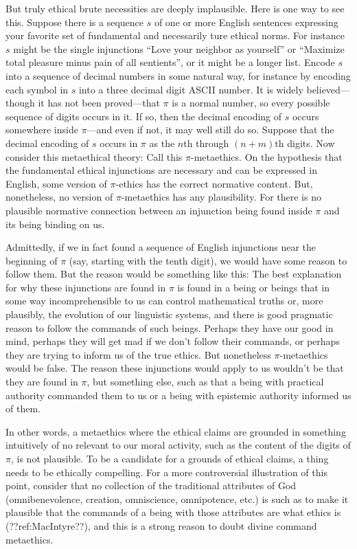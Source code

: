 But truly ethical brute necessities are deeply implausible. Here is one way to see this. Suppose there is a sequence $s$ of one or more English sentences expressing your 
favorite set of fundamental and necessarily ture ethical norms. For instance $s$ might be the single injunctions ``Love your neighbor as yourself'' or ``Maximize total pleasure minus 
pain of all sentients'', or it might be a longer list. Encode $s$ into a sequence of decimal numbers in some natural way, for instance by encoding each symbol in
$s$ into a three decimal digit ASCII number. It is widely believed---though it has not been proved---that $\pi$ is a normal number, so every possible sequence of
digits occurs in it. If so, then the decimal encoding of $s$ occurs somewhere inside $\pi$---and even if not, it may well still do so. Suppose that the decimal
encoding of $s$ occurs in $\pi$ as the $n$th through $(n+m)$th digits. Now consider this metaethical theory: 
Call this $\pi$-metaethics. On the hypothesis that the fundamental ethical injunctions are necessary and can be expressed in English, some version of $\pi$-ethics 
has the correct normative content. But, nonetheless, no version of $\pi$-metaethics 
has any plausibility. For there is no plausible normative connection between an injunction being found inside $\pi$ and its being binding on us.

Admittedly, if we in fact found a sequence of English injunctions near the beginning of $\pi$ (say, starting with the tenth digit), we would have some reason 
to follow them. But the reason would be something like this: The best explanation for why these injunctions are found in $\pi$ is found in a being or beings that
in some way incomprehensible to us can control mathematical truths or, more plausibly, the evolution of our linguistic systems, and there is good pragmatic reason to follow the commands of such beings. Perhaps they have
our good in mind, perhaps they will get mad if we don't follow their commands, or perhaps they are trying to inform us of the true ethics. But nonetheless
$\pi$-metaethics would be false. The reason these injunctions would apply to us wouldn't be that they are found in $\pi$, but something else, such as that
a being with practical authority commanded them to us or a being with epistemic authority informed us of them.

In other words, a metaethics where the ethical claims are grounded in something intuitively of no relevant to our moral activity, such as the content of the
digits of $\pi$, is not plausible. To be a candidate for a grounds of ethical claims, a thing needs to be ethically compelling. For a more controversial
illustration of this point, consider that no collection of the traditional attributes of God (omnibenevolence, creation, omniscience, omnipotence, etc.) is such 
as to make it plausible that the commands of a being with those attributes are what ethics is (??ref:MacIntyre??), and this is a strong reason to doubt divine
command metaethics. 

